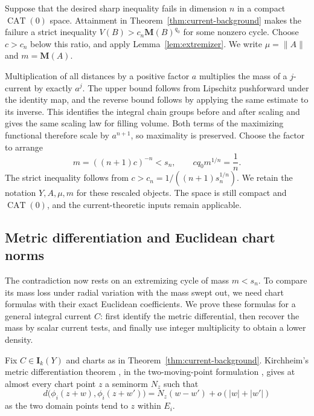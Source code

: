 \documentclass[11pt]{article}
\numberwithin{equation}{section}
\theoremstyle{definition}
\theoremstyle{remark}
\begin{document}
Suppose that the desired sharp inequality fails in dimension \(n\) in
a compact \(\operatorname{CAT}(0)\) space. Attainment in
Theorem~\ref{thm:current-background} makes the failure a strict inequality
\(V(B)>c_n\mathbf M(B)^{q_0}\) for some nonzero cycle. Choose
\(c>c_n\) below this ratio, and apply Lemma~\ref{lem:extremizer}.
We write
\(\mu=\|A\|\) and \(m=\mathbf M(A)\).

Multiplication of all distances by a positive factor \(a\) multiplies
the mass of a \(j\)-current by exactly \(a^j\). The upper bound follows
from Lipschitz pushforward under the identity map, and the reverse bound
follows by applying the same estimate to its inverse. This identifies
the integral chain groups before and after scaling and gives the same
scaling law for filling volume. Both terms of the maximizing functional
therefore scale by \(a^{n+1}\), so maximality is preserved. Choose the
factor to arrange
\begin{equation}
\label{eq:normalization}
 m=((n+1)c)^{-n}<s_n,
 \qquad cq_0m^{1/n}=\frac1n.
\end{equation}
The strict inequality follows from
\(c>c_n=1/((n+1)s_n^{1/n})\).
We retain the notation \(Y,A,\mu,m\) for these rescaled objects. The
space is still compact and \(\operatorname{CAT}(0)\), and the
current-theoretic inputs remain applicable.

\subsection{Metric differentiation and Euclidean chart norms}

The contradiction now rests on an extremizing cycle of mass $m<s_n$.
To compare its mass loss under radial variation with the mass swept out,
we need chart formulas with their exact Euclidean coefficients. We prove
these formulas for a general integral current $C$: first identify the
metric differential, then recover the mass by scalar current tests, and
finally use integer multiplicity to obtain a lower density.

Fix \(C\in\mathbf I_k(Y)\) and charts as in
Theorem~\ref{thm:current-background}. Kirchheim's metric differentiation
theorem \cite[Theorem~2]{Kirchheim1994}, in the two-moving-point formulation
\cite[Definition~(1.3) and Theorem~1.1]{Duda2007}, gives at almost every
chart point \(z\) a seminorm \(N_z\) such that
\begin{equation}
\label{eq:two-point-metric-differential}
 d\bigl(\phi_i(z+w),\phi_i(z+w')\bigr)
 =N_z(w-w')+o(|w|+|w'|)
\end{equation}
as the two domain points tend to \(z\) within \(E_i\).
\end{document}
